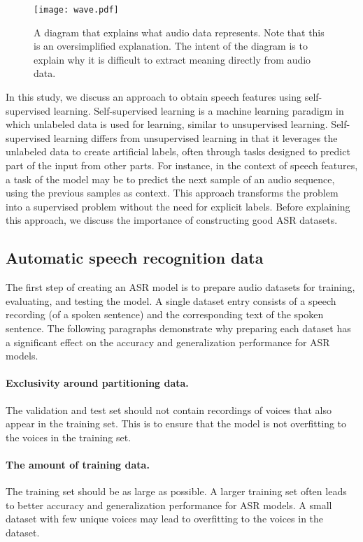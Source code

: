 \newpage

\begin{figure}[!ht]
    \centering
    \texttt{[image: wave.pdf]}
    \caption{A diagram that explains what audio data represents. Note that this is an oversimplified explanation. 
    The intent of the diagram is to explain why it is difficult to extract meaning directly from audio data.}
    \label{fig:wave}
\end{figure}

In this study, we discuss an approach to obtain speech features using self-supervised learning.
Self-supervised learning is a machine learning paradigm in which unlabeled data is used for learning, similar to unsupervised learning.
Self-supervised learning differs from unsupervised learning in that it leverages the unlabeled data to create artificial labels, 
often through tasks designed to predict part of the input from other parts. 
For instance, in the context of speech features, a task of the model may be to predict the next sample of an audio sequence, 
using the previous samples as context.
This approach transforms the problem into a supervised problem without the need for explicit labels. 
Before explaining this approach, we discuss the importance of constructing good ASR datasets.

\subsection{Automatic speech recognition data}
The first step of creating an ASR model is to prepare audio datasets for training, evaluating, and testing the model.
A single dataset entry consists of a speech recording (of a spoken sentence) and the corresponding text of the spoken sentence.
The following paragraphs demonstrate why preparing each dataset
has a significant effect on the accuracy and generalization performance for ASR models.

\paragraph*{Exclusivity around partitioning data.}\label{par:excl_split}
The validation and test set should not contain recordings of voices that also appear in the training set.
This is to ensure that the model is not overfitting to the voices in the training set.

\paragraph*{The amount of training data.}
The training set should be as large as possible.
A larger training set often leads to better accuracy and generalization performance for ASR models.
A small dataset with few unique voices may lead to overfitting to the voices in the dataset.


